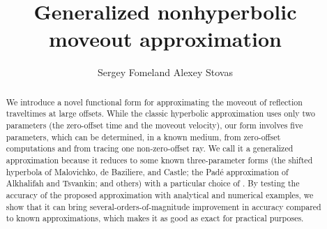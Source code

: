 \title{Generalized nonhyperbolic moveout approximation}

\renewcommand{\thefootnote}{\fnsymbol{footnote}}
\newcommand{\arccosh}{\mbox{arccosh}}


\author{Sergey Fomel\footnotemark[1] and Alexey Stovas\footnotemark[2]}

\address{
\footnotemark[1]Bureau of Economic Geology, \\
John A. and Katherine G. Jackson School of Geosciences \\
The University of Texas at Austin \\
University Station, Box X \\
Austin, TX 78713-8972 \\
USA \\
sergey.fomel@beg.utexas.edu \\
\footnotemark[2]Department of Petroleum Engineering and
Applied Geophysics \\
Norwegian University of Science and Technology (NTNU) \\
S.P. Andersenvei 15A \\
7491 Trondheim \\
Norway \\
alexey.stovas@ntnu.no
}

\maketitle

\begin{abstract}
We introduce a novel functional form for approximating the moveout of
reflection traveltimes at large offsets. While the classic hyperbolic
approximation uses only two parameters (the zero-offset time and the
moveout velocity), our form involves five parameters, which can be
determined, in a known medium, from zero-offset computations and from
tracing one non-zero-offset ray. We call it a generalized
approximation because it reduces to some known three-parameter forms
(the shifted hyperbola of Malovichko, de Baziliere, and Castle; the
Pad\'{e} approximation of Alkhalifah and Tsvankin; and others) with a
particular choice of  . By testing
the accuracy of the proposed approximation with analytical and
numerical examples, we show that it can bring
several-orders-of-magnitude improvement in accuracy  compared to known  approximations, which
makes it as good as exact for   practical purposes.
\end{abstract}

